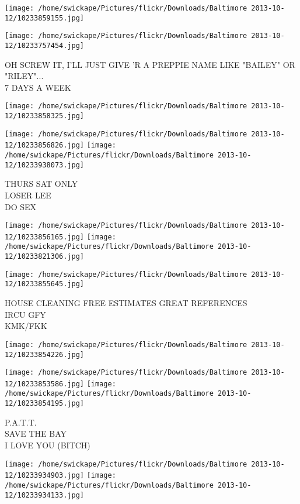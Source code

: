 \documentclass[10pt,letterpaper]{article}
\begin{document}
\texttt{[image: /home/swickape/Pictures/flickr/Downloads/Baltimore 2013-10-12/10233859155.jpg]}

\vspace{0.25in}
\texttt{[image: /home/swickape/Pictures/flickr/Downloads/Baltimore 2013-10-12/10233757454.jpg]}

OH SCREW IT, I'LL JUST GIVE 'R A PREPPIE NAME LIKE "BAILEY" OR "RILEY"...\\
7 DAYS A WEEK
\pagebreak

\texttt{[image: /home/swickape/Pictures/flickr/Downloads/Baltimore 2013-10-12/10233858325.jpg]}

\vspace{0.25in}
\texttt{[image: /home/swickape/Pictures/flickr/Downloads/Baltimore 2013-10-12/10233856826.jpg]}
\texttt{[image: /home/swickape/Pictures/flickr/Downloads/Baltimore 2013-10-12/10233938073.jpg]}

THURS SAT ONLY\\
LOSER LEE\\
DO SEX
\pagebreak

\texttt{[image: /home/swickape/Pictures/flickr/Downloads/Baltimore 2013-10-12/10233856165.jpg]}
\texttt{[image: /home/swickape/Pictures/flickr/Downloads/Baltimore 2013-10-12/10233821306.jpg]}

\vspace{0.25in}
\texttt{[image: /home/swickape/Pictures/flickr/Downloads/Baltimore 2013-10-12/10233855645.jpg]}

HOUSE CLEANING FREE ESTIMATES GREAT REFERENCES\\
IRCU GFY\\
KMK/FKK
\pagebreak

\texttt{[image: /home/swickape/Pictures/flickr/Downloads/Baltimore 2013-10-12/10233854226.jpg]}

\vspace{0.25in}
\texttt{[image: /home/swickape/Pictures/flickr/Downloads/Baltimore 2013-10-12/10233853586.jpg]}
\texttt{[image: /home/swickape/Pictures/flickr/Downloads/Baltimore 2013-10-12/10233854195.jpg]}

P.A.T.T.\\
SAVE THE BAY\\
I LOVE YOU (BITCH)
\pagebreak

\texttt{[image: /home/swickape/Pictures/flickr/Downloads/Baltimore 2013-10-12/10233934903.jpg]}
\texttt{[image: /home/swickape/Pictures/flickr/Downloads/Baltimore 2013-10-12/10233934133.jpg]}
\end{document}
